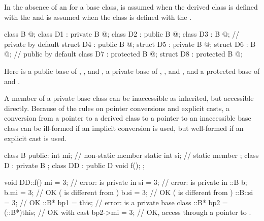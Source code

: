 \pnum
In the absence of an
for a base class,
is assumed when the derived class is
defined with the 
and
is assumed when the class is
defined with the 
.
\begin{example}
\begin{codeblock}
class B { @\commentellip@ };
class D1 : private B { @\commentellip@ };
class D2 : public B { @\commentellip@ };
class D3 : B { @\commentellip@ };             //  private by default
struct D4 : public B { @\commentellip@ };
struct D5 : private B { @\commentellip@ };
struct D6 : B { @\commentellip@ };            //  public by default
class D7 : protected B { @\commentellip@ };
struct D8 : protected B { @\commentellip@ };
\end{codeblock}

Here
is a public base of
,
,
and
,
a private base of
,
,
and
,
and a protected base of
and
.
\end{example}

\pnum
\begin{note}
A member of a private base class can be inaccessible as inherited,
but accessible directly.
Because of the rules on pointer conversions and
explicit casts,
a conversion from a pointer to a derived class to a pointer
to an inaccessible base class can be ill-formed if an implicit conversion
is used, but well-formed if an explicit cast is used.
\begin{example}
\begin{codeblock}
class B {
public:
  int mi;                       // non-static member
  static int si;                // static member
};
class D : private B {
};
class DD : public D {
  void f();
};

void DD::f() {
  mi = 3;                       // error:  is private in 
  si = 3;                       // error:  is private in 
  ::B  b;
  b.mi = 3;                     // OK ( is different from )
  b.si = 3;                     // OK ( is different from )
  ::B::si = 3;                  // OK
  ::B* bp1 = this;              // error:  is a private base class
  ::B* bp2 = (::B*)this;        // OK with cast
  bp2->mi = 3;                  // OK, access through a pointer to .
}
\end{codeblock}
\end{example}
\end{note}

